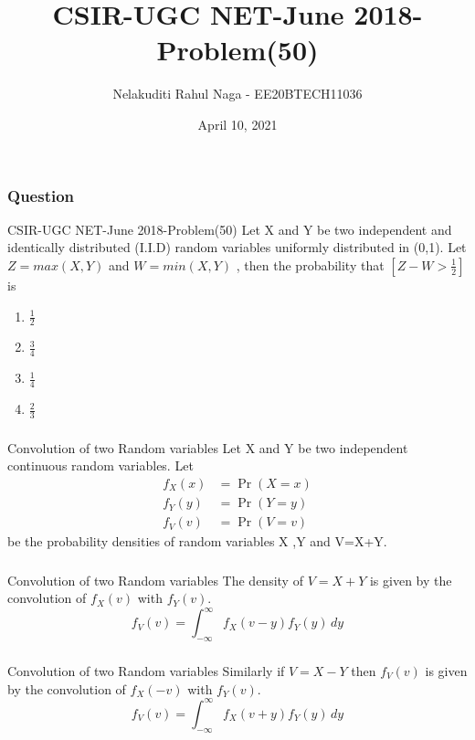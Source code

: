 \documentclass{beamer}
\title{CSIR-UGC NET-June 2018-Problem(50)}
\author{Nelakuditi Rahul Naga - EE20BTECH11036}
\date{April 10, 2021}
\providecommand{\pr}[1]{\ensuremath{\Pr\left(#1\right)}}
\begin{document}
\begin{frame}
\titlepage
\end{frame}

\begin{frame}
\frametitle{Question}
\begin{block}{CSIR-UGC NET-June 2018-Problem(50)}
Let X and Y be two independent and identically distributed (I.I.D) random variables uniformly distributed in (0,1). Let $Z = max(X,Y)$ and $W = min(X,Y)$ , then the probability that $[Z-W >\frac{1}{2}]$ is
\begin{enumerate}
    \item $\frac{1}{2}$
    \item $\frac{3}{4}$
    \item $\frac{1}{4}$
    \item $\frac{2}{3}$
\end{enumerate}
\end{block}
\end{frame}

\begin{frame}
\frametitle{}
\begin{block}{Convolution of two Random variables}
Let X and Y be two independent continuous random variables. Let
\begin{align}
    f_X(x) &= \pr{X=x}\\
    f_Y(y) &= \pr{Y=y}\\
    f_V(v) &= \pr{V=v}
\end{align}
be the probability densities of random variables X ,Y and V=X+Y.
\end{block}
\end{frame}

\begin{frame}
\frametitle{}
\begin{block}{Convolution of two Random variables}
The density of $V=X+Y $ is given by the convolution of $f_X(v)$ with $f_Y(v)$.
\begin{equation}
    f_V(v) =  \int_{- \infty}^{\infty} f_X(v-y)f_Y(y) \,dy 
\end{equation}
\end{block}
\end{frame}

\begin{frame}
\frametitle{}
\begin{block}{Convolution of two Random variables}
Similarly if $V=X-Y $ then $f_V(v)$ is given by the convolution of $f_X(-v)$ with $f_Y(v)$.
\begin{equation}
    f_V(v) =  \int_{- \infty}^{\infty} f_X(v+y)f_Y(y) \,dy 
\end{equation}
\end{block}
\end{frame}
\end{document}
